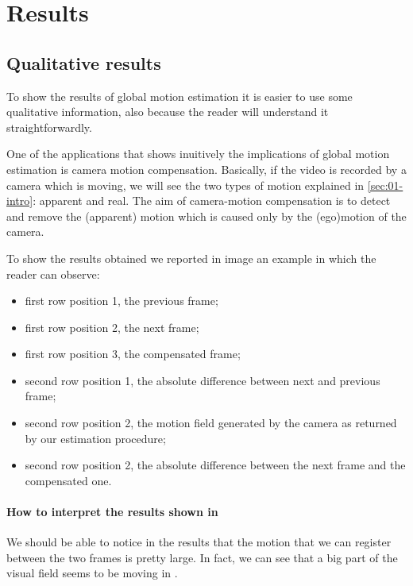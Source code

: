 \section{Results}
\label{sec:04-results}

\subsection{Qualitative results}

To show the results of global motion estimation it is easier to use some qualitative information, also because the reader will understand it straightforwardly.

One of the applications that shows inuitively the implications of global motion estimation is camera motion compensation. 
Basically, if the video is recorded by a camera which is moving, we will see the two types of motion explained in \cref{sec:01-intro}: apparent and real. The aim of camera-motion compensation is to detect and remove the (apparent) motion which is caused only by the (ego)motion of the camera.

To show the results obtained we reported in image  an example in which the reader can observe:
\begin{itemize}
    \item first row position 1, the previous frame;
    \item first row position 2, the next frame;
    \item first row position 3, the compensated frame;
    \item second row position 1, the absolute difference between next and previous frame;
    \item second row position 2, the motion field generated by the camera as returned by our estimation procedure;
    \item second row position 2, the absolute difference between the next frame and the compensated one.
\end{itemize}


\paragraph{How to interpret the results shown in } We should be able to notice in the results that the motion that we can register between the two frames is pretty large. In fact, we can see that a big part of the visual field seems to be moving in .

